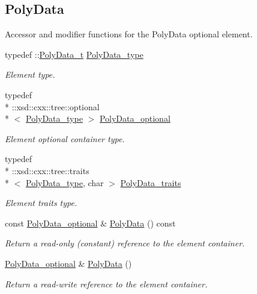 \subsection*{Poly\+Data}
\label{_amgrpf4abb74983d657d0185d4dd07cff9b2c}%
Accessor and modifier functions for the Poly\+Data optional element. \begin{DoxyCompactItemize}
\item 
typedef \+::\hyperlink{classPolyData__t}{Poly\+Data\+\_\+t} \hyperlink{classVTKFile__t_a4588b4f0e28ba09aa219bda7e1fc6c97}{Poly\+Data\+\_\+type}
\begin{DoxyCompactList}\small\item\em Element type. \end{DoxyCompactList}\item 
typedef \\*
\+::xsd\+::cxx\+::tree\+::optional\\*
$<$ \hyperlink{classVTKFile__t_a4588b4f0e28ba09aa219bda7e1fc6c97}{Poly\+Data\+\_\+type} $>$ \hyperlink{classVTKFile__t_aacb796775ae228cd61726a23b809f3e4}{Poly\+Data\+\_\+optional}
\begin{DoxyCompactList}\small\item\em Element optional container type. \end{DoxyCompactList}\item 
typedef \\*
\+::xsd\+::cxx\+::tree\+::traits\\*
$<$ \hyperlink{classVTKFile__t_a4588b4f0e28ba09aa219bda7e1fc6c97}{Poly\+Data\+\_\+type}, char $>$ \hyperlink{classVTKFile__t_aa5ad98f5709c1e9beec3804a7f42b5f6}{Poly\+Data\+\_\+traits}
\begin{DoxyCompactList}\small\item\em Element traits type. \end{DoxyCompactList}\item 
const \hyperlink{classVTKFile__t_aacb796775ae228cd61726a23b809f3e4}{Poly\+Data\+\_\+optional} \& \hyperlink{classVTKFile__t_a7d728d7f31157fc80117c2f80978344c}{Poly\+Data} () const 
\begin{DoxyCompactList}\small\item\em Return a read-\/only (constant) reference to the element container. \end{DoxyCompactList}\item 
\hyperlink{classVTKFile__t_aacb796775ae228cd61726a23b809f3e4}{Poly\+Data\+\_\+optional} \& \hyperlink{classVTKFile__t_a0f87118c1898bc43619fa0bade52e921}{Poly\+Data} ()
\begin{DoxyCompactList}\small\item\em Return a read-\/write reference to the element container. \end{DoxyCompactList}\item 

\end{DoxyCompactItemize}
